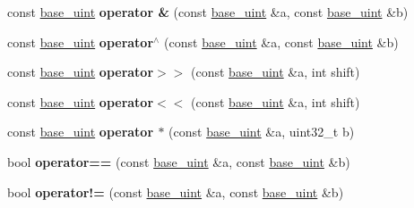 \begin{DoxyCompactItemize}
\item 
\mbox{\label{classbase__uint_aa74c23e8c43f17bc7c4ecabc3406bb77}} 
const \mbox{\hyperlink{classbase__uint}{base\+\_\+uint}} {\bfseries operator \&} (const \mbox{\hyperlink{classbase__uint}{base\+\_\+uint}} \&a, const \mbox{\hyperlink{classbase__uint}{base\+\_\+uint}} \&b)
\item 
\mbox{\label{classbase__uint_aa9c66282ad78846e8310984aeb2df49d}} 
const \mbox{\hyperlink{classbase__uint}{base\+\_\+uint}} {\bfseries operator$^\wedge$} (const \mbox{\hyperlink{classbase__uint}{base\+\_\+uint}} \&a, const \mbox{\hyperlink{classbase__uint}{base\+\_\+uint}} \&b)
\item 
\mbox{\label{classbase__uint_a9d619adcbf9ad5539f5e98f739edd15d}} 
const \mbox{\hyperlink{classbase__uint}{base\+\_\+uint}} {\bfseries operator$>$$>$} (const \mbox{\hyperlink{classbase__uint}{base\+\_\+uint}} \&a, int shift)
\item 
\mbox{\label{classbase__uint_acee16d973ae59087cd962720773f53dd}} 
const \mbox{\hyperlink{classbase__uint}{base\+\_\+uint}} {\bfseries operator$<$$<$} (const \mbox{\hyperlink{classbase__uint}{base\+\_\+uint}} \&a, int shift)
\item 
\mbox{\label{classbase__uint_a7d23d0ec9b97f9b0d38903302e26c3f4}} 
const \mbox{\hyperlink{classbase__uint}{base\+\_\+uint}} {\bfseries operator $\ast$} (const \mbox{\hyperlink{classbase__uint}{base\+\_\+uint}} \&a, uint32\+\_\+t b)
\item 
\mbox{\label{classbase__uint_aafca305decdfd2ded4688213ab4a55fa}} 
bool {\bfseries operator==} (const \mbox{\hyperlink{classbase__uint}{base\+\_\+uint}} \&a, const \mbox{\hyperlink{classbase__uint}{base\+\_\+uint}} \&b)
\item 
\mbox{\label{classbase__uint_a3cc3bccf252004fbbd2b96dc769378e7}} 
bool {\bfseries operator!=} (const \mbox{\hyperlink{classbase__uint}{base\+\_\+uint}} \&a, const \mbox{\hyperlink{classbase__uint}{base\+\_\+uint}} \&b)
\item 
\mbox{\label{classbase__uint_ac59719bd052d5dc2afcc35ae4a8843ab}} 

\end{DoxyCompactItemize}

